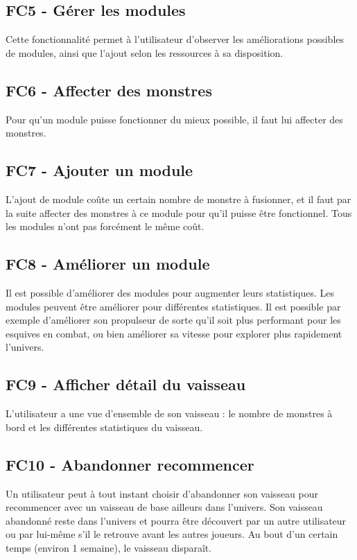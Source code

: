 \documentclass[a4paper,11pt]{report}
\begin{document}
        \subsection{FC5 - Gérer les modules}
            Cette fonctionnalité permet à l'utilisateur d'observer les améliorations possibles de modules, ainsi que l'ajout selon les ressources à sa disposition.

        \subsection{FC6 - Affecter des monstres}
            Pour qu'un module puisse fonctionner du mieux possible, il faut lui affecter des monstres.

        \subsection{FC7 - Ajouter un module}
            L'ajout de module coûte un certain nombre de monstre à fusionner, et il faut par la suite affecter des monstres à ce module pour qu'il puisse être fonctionnel. Tous les modules n'ont pas forcément le même coût.

        \subsection{FC8 - Améliorer un module}
            Il est possible d'améliorer des modules pour augmenter leurs statistiques. Les modules peuvent être améliorer pour différentes statistiques. Il est possible par exemple d'améliorer son propulseur de sorte qu'il soit plus performant pour les esquives en combat, ou bien améliorer sa vitesse pour explorer plus rapidement l'univers.

        \subsection{FC9 - Afficher détail du vaisseau}
            L'utilisateur a une vue d'ensemble de son vaisseau : le nombre de monstres à bord et les différentes statistiques du vaisseau.

        \subsection{FC10 - Abandonner recommencer}
            Un utilisateur peut à tout instant choisir d'abandonner son vaisseau pour recommencer avec un vaisseau de base ailleurs dans l'univers. Son vaisseau abandonné reste dans l'univers et pourra être découvert par un autre utilisateur ou par lui-même s'il le retrouve avant les autres joueurs. Au bout d'un certain temps (environ 1 semaine), le vaisseau disparaît.
\end{document}
